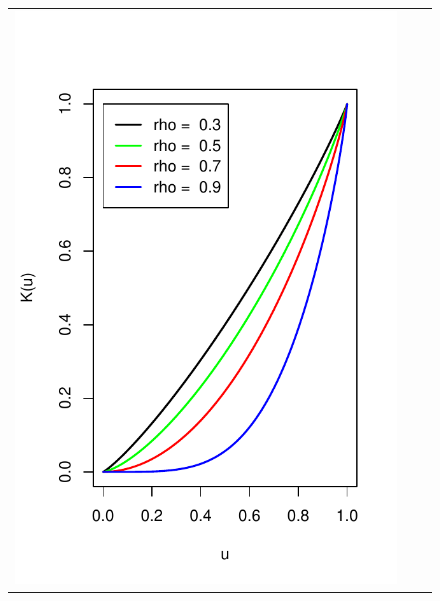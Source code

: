 \documentclass[12pt]{article}
\begin{document}
\begin{figure}[h]
\begin{tabular}{ccc}
\includegraphics[scale = 0.45, clip = true, trim = 0.05in 0 0.2in 0.6in]{illus_rhos_Kfunc.pdf} &

\end{tabular}
\end{figure}
\end{document}
